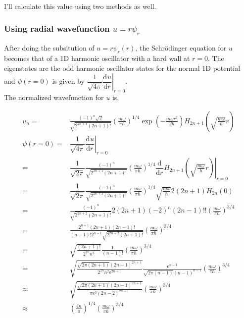 \documentclass[10pt,fleqn]{article}
\newcommand{\ud}{\mathrm{d}}
\newcommand{\ue}{\mathrm{e}}
\newcommand{\eqar}[1]
{
  \begin{align*}
    #1
  \end{align*}
}
\newcommand{\paren}[1]{{\left({#1}\right)}}
\newcommand{\ddiff}[3][{}]{{\dfrac{\ud^{#1} {#2}}{\ud {#3}{}^{#1}}}}
\begin{document}
I'll calculate this value using two methods as well.

\subsubsection{Using radial wavefunction $u=r\psi_r$}

After doing the subsitution of $u=r\psi_r(r)$, the Schr\"odinger equation for $u$ becomes
that of a 1D harmonic oscillator with a hard wall at $r=0$. The eigenstates are the odd
harmonic oscillator states for the normal 1D potential and $\psi(r=0)$ is given by $\left.\dfrac{1}{\sqrt{4\pi}}\ddiff{u}{r}\right|_{r=0}$.\\

The normalized wavefunction for $u$ is,

\eqar{
  u_n=&\frac{(-1)^n\sqrt{2}}{\sqrt{2^{2n+1}(2n+1)!}}\paren{\frac{m\omega}{\pi\hbar}}^{1/4}\exp\paren{-\frac{m\omega r^2}{2\hbar}}H_{2n+1}\paren{\sqrt{\frac{m\omega}{\hbar}}r}\\
  \psi(r=0)=&\left.\dfrac{1}{\sqrt{4\pi}}\ddiff{u}{r}\right|_{r=0}\\
  =&\dfrac{1}{\sqrt{2\pi}}\frac{(-1)^n}{\sqrt{2^{2n+1}(2n+1)!}}\paren{\frac{m\omega}{\pi\hbar}}^{1/4}
  \left.\ddiff{}{r}H_{2n+1}\paren{\sqrt{\frac{m\omega}{\hbar}}r}\right|_{r=0}\\
  =&\dfrac{1}{\sqrt{2\pi}}\frac{(-1)^n}{\sqrt{2^{2n+1}(2n+1)!}}\paren{\frac{m\omega}{\pi\hbar}}^{1/4}\sqrt{\frac{m\omega}{\hbar}}2(2n + 1) H_{2n}\paren{0}\\
  =&\frac{(-1)^n}{\sqrt{2^{2n+2}(2n+1)!}}2(2n + 1)(-2)^n (2n - 1)!!\paren{\frac{m\omega}{\pi\hbar}}^{3/4}\\
  =&\frac{2^{n+1}(2n + 1) (2n - 1)!}{(n-1)!2^{n-1}\sqrt{2^{2n+2}(2n+1)!}}\paren{\frac{m\omega}{\pi\hbar}}^{3/4}\\
  =&\sqrt{\frac{(2n + 1)!}{2^{2n}n^2}}\frac{1}{(n-1)!}\paren{\frac{m\omega}{\pi\hbar}}^{3/4}\\
  =&\sqrt{\frac{\sqrt{2\pi (2n+1)}(2n+1)^{2n+1}}{2^{2n}n^2\ue^{2n+1}}}\frac{\ue^{n-1}}{\sqrt{2\pi (n-1)}(n-1)^{n-1}}\paren{\frac{m\omega}{\pi\hbar}}^{3/4}\\
  \approx&\sqrt{\frac{\sqrt{2\pi(2n+1)}(2n+1)^{2n+1}}{\pi\ue^{3}(2n-2)^{2n+1}}}\paren{\frac{m\omega}{\pi\hbar}}^{3/4}\\
  \approx&\paren{\frac{4n}{\pi}}^{1/4}\paren{\frac{m\omega}{\pi\hbar}}^{3/4}
}
\end{document}
